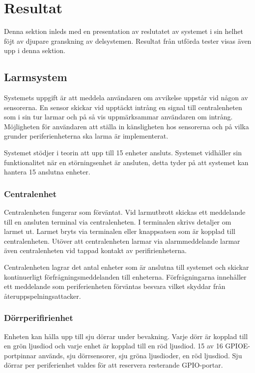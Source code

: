 \documentclass[a4paper]{article}
\newcommand{\todo}[1]{\marginpar{TODO: #1}\vspace{1cm}}
\begin{document}
\section{Resultat}
Denna sektion inleds med en presentation av reslutatet av systemet i sin helhet föjt av djupare granskning av delsystemen. Resultat från utförda tester visas även upp i denna sektion.

\subsection{Larmsystem}
Systemets uppgift är att meddela användaren om avvikelse uppstår vid någon av sensorerna. En sensor skickar vid upptäckt intrång en signal till centralenheten som i sin tur larmar och på så vis uppmärksammar användaren om intrång. Möjligheten för användaren att ställa in känsligheten hos sensorerna och på vilka grunder periferienheterna ska larma är implementerat.

Systemet stödjer i teorin att upp till 15 enheter ansluts. Systemet vidhåller sin funktionalitet när en störningsenhet är ansluten, detta tyder på att systemet kan hantera 15 anslutna enheter.

\subsubsection{Centralenhet}
Centralenheten fungerar som förväntat. Vid larmutbrott skickas ett meddelande till en ansluten terminal via centralenheten. I terminalen skrivs detaljer om larmet ut. Larmet bryts via terminalen eller knappsatsen som är kopplad till centralenheten. Utöver att centralenheten larmar via alarmmeddelande larmar även centralenheten vid tappad kontakt av perifirienheterna.

Centralenheten lagrar det antal enheter som är anslutna till systemet och skickar kontinuerligt förfrågningsmeddelanden till enheterna. Förfrågningarna innehåller ett meddelande som periferienheten förväntas besvara vilket skyddar från återuppspelningsattacker.

\subsubsection{Dörrperifirienhet}
\todo{Motivera varför 7 dörrar används}
Enheten kan hålla upp till sju dörrar under bevakning. 
Varje dörr är kopplad till en grön ljusdiod och varje enhet är kopplad till en röd ljusdiod.
15 av 16 GPIOE-portpinnar används, sju dörrsensorer, sju gröna ljusdioder, en röd ljusdiod.
Sju dörrar per periferienhet valdes för att reservera resterande GPIO-portar.
\end{document}
